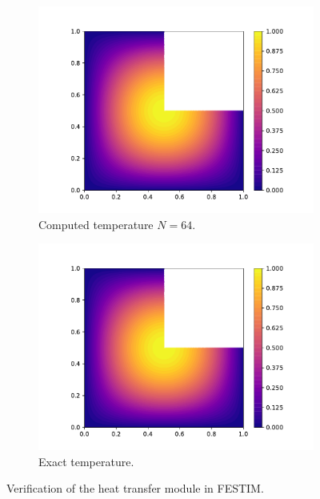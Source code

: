 \begin{figure}
    \centering
    \begin{subfigure}{0.5\linewidth}
        \centering
        \includegraphics[width=\linewidth]{Figures/Chapter2/T.pdf}
        \caption{Computed temperature $N=64$.}
    \end{subfigure}%
    \begin{subfigure}{0.5\linewidth}
        \centering
        \includegraphics[width=\linewidth]{Figures/Chapter2/T_exact.pdf}
        \caption{Exact temperature.}
    \end{subfigure}

    \caption{Verification of the heat transfer module in FESTIM.}
\end{figure}

